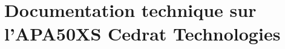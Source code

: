 

\lhead[\fancyplain{}{\leftmark}]%
      {\fancyplain{}{}} %
\chead[\fancyplain{}{}]%
      {\fancyplain{}{}}
\rhead[\fancyplain{}{}]%
      {\fancyplain{}{\rightmark}}%
\lfoot[\fancyplain{}{}]%
      {\fancyplain{}{}}
\cfoot[\fancyplain{}{\thepage}]%
      {\fancyplain{}{\thepage}} %
\rfoot[\fancyplain{}{}]%
     {\fancyplain{}{\scriptsize}}



\chapter{Documentation technique sur l'APA50XS Cedrat Technologies}
\label{Ann:6_Documentation technique sur l'APA50XS Cedrat Technologies}

\minitoc
\newpage

